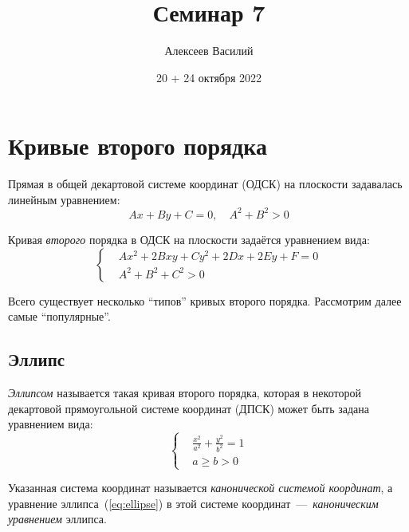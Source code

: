 \documentclass[a4paper,12pt]{article}
\author{Алексеев Василий}
\title{Семинар 7}
\date{20 + 24 октября 2022}
\begin{document}
  \maketitle
  
  \tableofcontents

  \thispagestyle{empty}
  
  \newpage
  


  \section{Кривые второго порядка}
  
  Прямая в общей декартовой системе координат (ОДСК) на плоскости задавалась линейным уравнением:
  \[
    Ax + By + C = 0,\quad A^2 + B^2 > 0
  \]
  
  Кривая \emph{второго} порядка в ОДСК на плоскости задаётся уравнением вида:
  \[
    \boxed{
      \left\{
        \begin{aligned}
          &Ax^2 + 2Bxy + Cy^2 + 2Dx + 2Ey + F = 0\\
          &A^2 + B^2 + C^2 > 0
        \end{aligned}
      \right.
    }
  \]
  
  Всего существует несколько ``типов'' кривых второго порядка.
  Рассмотрим далее самые ``популярные''.
  
  
  \subsection{Эллипс}
  
  \begin{definition}
    \emph{Эллипсом} называется такая кривая второго порядка, которая в некоторой декартовой прямоугольной системе координат (ДПСК) может быть задана уравнением вида:
    \begin{equation}\label{eq:ellipse}
      \boxed{
        \left\{
          \begin{aligned}
            &\frac{x^2}{a^2} + \frac{y^2}{b^2} = 1\\
            &a \geq b > 0
          \end{aligned}
        \right.
      }
    \end{equation}
    
    Указанная система координат называется \emph{канонической системой координат}, а уравнение эллипса~(\ref{eq:ellipse}) в этой системе координат~---~\emph{каноническим уравнением} эллипса.
  \end{definition}
  
\end{document}
